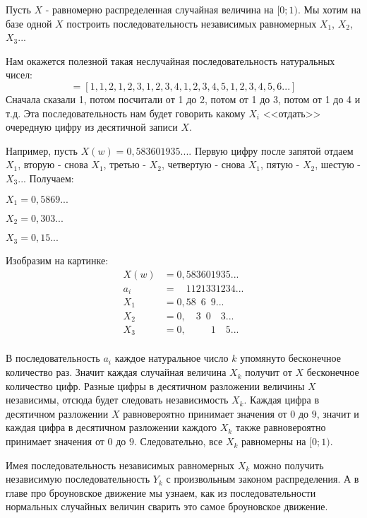 {Пусть $X$ - равномерно распределенная случайная величина на $[0;1)$. Мы хотим на базе одной $X$ построить последовательность независимых равномерных $X_{1}$, $X_{2}$, $X_{3}$... 

Нам окажется полезной такая неслучайная последовательность натуральных чисел:
\begin{equation}
[a_{i}]=[1,1,2,1,2,3,1,2,3,4,1,2,3,4,5,1,2,3,4,5,6...]
\end{equation}
Сначала сказали 1, потом посчитали от 1 до 2, потом от 1 до 3, потом от 1 до 4 и т.д. Эта последовательность нам будет говорить какому $X_{i}$ <<отдать>> очередную цифру из десятичной записи $X$.

Например, пусть $X(w)=0,583601935...$. Первую цифру после запятой отдаем $X_{1}$, вторую - снова $X_{1}$, третью - $X_{2}$, четвертую - снова $X_{1}$, пятую - $X_{2}$, шестую - $X_{3}$... Получаем:

$X_{1}=0,5869...$

$X_{2}=0,303...$

$X_{3}=0,15...$

Изобразим на картинке:
\begin{align*}
X(w) &=0,583601935...\\
a_{i} &=\phantom{0,}1121331234...\\
X_{1}&=0,58\phantom{0}6\phantom{0}9...\\
X_{2}&=0,\phantom{00}3\phantom{0}0\phantom{00}3...\\
X_{3}&=0,\phantom{00000}1\phantom{00}5...\\
\end{align*}



В последовательность $a_{i}$ каждое натуральное число $k$ упомянуто бесконечное количество раз. Значит каждая случайная величина  $X_{k}$ получит от $X$ бесконечное количество цифр. Разные цифры в десятичном разложении величины $X$ независимы, отсюда будет следовать независимость $X_{k}$. Каждая цифра в десятичном разложении $X$ равновероятно принимает значения от $0$ до $9$, значит и каждая цифра в десятичном разложении каждого $X_{k}$ также равновероятно принимает значения от $0$ до $9$. Следовательно, все $X_{k}$ равномерны на $[0;1)$.

Имея последовательность независимых равномерных $X_{k}$ можно получить независимую последовательность $Y_{k}$ с произвольным законом распределения. А в главе про броуновское движение мы узнаем, как из последовательности нормальных случайных величин сварить это самое броуновское движение.

}
